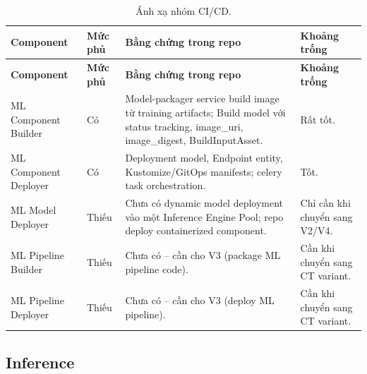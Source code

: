 \documentclass[11pt,a4paper]{article}
\newcommand{\statusyes}{\textcolor{green!45!black}{Có}}
\newcommand{\statusno}{\textcolor{red!60!black}{Thiếu}}
\begin{document}
\begin{longtable}{@{}P{2.6cm}P{1.6cm}P{4.7cm}P{4.5cm}@{}}
\caption{Ánh xạ nhóm CI/CD.}\\
\toprule
\textbf{Component} & \textbf{Mức phủ} & \textbf{Bằng chứng trong repo} & \textbf{Khoảng trống} \\
\midrule
\endfirsthead
\toprule
\textbf{Component} & \textbf{Mức phủ} & \textbf{Bằng chứng trong repo} & \textbf{Khoảng trống} \\
\midrule
\endhead
ML Component Builder & \statusyes & Model-packager service build image từ training artifacts; Build model với status tracking, image\_uri, image\_digest, BuildInputAsset. & Rất tốt. \\
\addlinespace
ML Component Deployer & \statusyes & Deployment model, Endpoint entity, Kustomize/GitOps manifests; celery task orchestration. & Tốt. \\
\addlinespace
ML Model Deployer & \statusno & Chưa có dynamic model deployment vào một Inference Engine Pool; repo deploy containerized component. & Chỉ cần khi chuyển sang V2/V4. \\
\addlinespace
ML Pipeline Builder & \statusno & Chưa có -- cần cho V3 (package ML pipeline code). & Cần khi chuyển sang CT variant. \\
\addlinespace
ML Pipeline Deployer & \statusno & Chưa có -- cần cho V3 (deploy ML pipeline). & Cần khi chuyển sang CT variant. \\
\bottomrule
\end{longtable}

\subsection{Inference}
\end{document}
